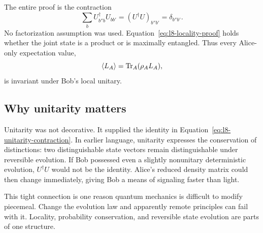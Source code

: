The entire proof is the contraction
\begin{equation}
\sum_bU^\dagger_{b''b}U_{bb'}
=(U^\dagger U)_{b''b'}
=\delta_{b''b'}.
\label{eq:l8-unitarity-contraction}
\end{equation}
No factorization assumption was used. Equation~\eqref{eq:l8-locality-proof} holds whether the joint state is a product or is maximally entangled. Thus every Alice-only expectation value,
\begin{equation}
\left\langle L_A\right\rangle
=
\operatorname{Tr}_A(\rho_A L_A),
\end{equation}
is invariant under Bob's local unitary.

\begin{classroomqa}
\end{classroomqa}

\begin{classroomqa}
\end{classroomqa}

\subsection{Why unitarity matters}

Unitarity was not decorative. It supplied the identity in Equation~\eqref{eq:l8-unitarity-contraction}. In earlier language, unitarity expresses the conservation of distinctions: two distinguishable state vectors remain distinguishable under reversible evolution. If Bob possessed even a slightly nonunitary deterministic evolution, \(U^\dagger U\) would not be the identity. Alice's reduced density matrix could then change immediately, giving Bob a means of signaling faster than light.

This tight connection is one reason quantum mechanics is difficult to modify piecemeal. Change the evolution law and apparently remote principles can fail with it. Locality, probability conservation, and reversible state evolution are parts of one structure.

